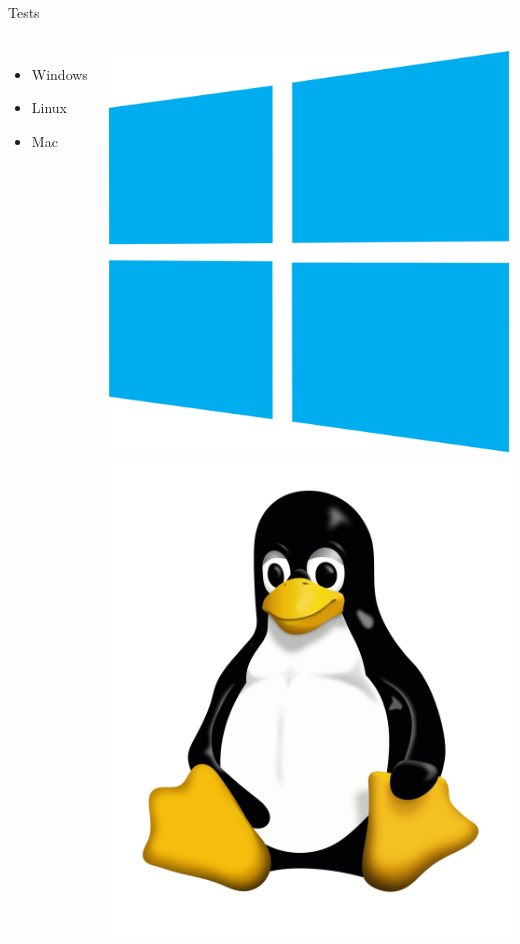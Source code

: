 \documentclass{beamer}
\begin{document}
\begin{frame}{Tests}
\begin{columns}
	\begin{itemize}
		\item Windows
		\item Linux
		\item Mac
	\end{itemize}
	\includegraphics[scale=0.05]{../images/windows10img} \hspace{2em}
	\includegraphics[scale=0.05]{../images/linuximg}\\ \hspace{2.5em}

\end{columns}
\end{frame}
\end{document}
